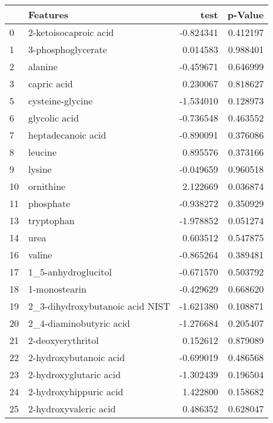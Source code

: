 \begin{tabular}{llrr}
\toprule
{} &                           Features &      test &   p-Value \\
\midrule
0   &              2-ketoisocaproic acid & -0.824341 &  0.412197 \\
1   &                 3-phosphoglycerate &  0.014583 &  0.988401 \\
2   &                            alanine & -0.459671 &  0.646999 \\
3   &                        capric acid &  0.230067 &  0.818627 \\
5   &                   cysteine-glycine & -1.534010 &  0.128973 \\
6   &                      glycolic acid & -0.736548 &  0.463552 \\
7   &                 heptadecanoic acid & -0.890091 &  0.376086 \\
8   &                            leucine &  0.895576 &  0.373166 \\
9   &                             lysine & -0.049659 &  0.960518 \\
10  &                          ornithine &  2.122669 &  0.036874 \\
11  &                          phosphate & -0.938272 &  0.350929 \\
13  &                         tryptophan & -1.978852 &  0.051274 \\
14  &                               urea &  0.603512 &  0.547875 \\
16  &                             valine & -0.865264 &  0.389481 \\
17  &                1\_5-anhydroglucitol & -0.671570 &  0.503792 \\
18  &                      1-monostearin & -0.429629 &  0.668620 \\
19  &    2\_3-dihydroxybutanoic acid NIST & -1.621380 &  0.108871 \\
20  &            2\_4-diaminobutyric acid & -1.276684 &  0.205407 \\
21  &                  2-deoxyerythritol &  0.152612 &  0.879089 \\
22  &             2-hydroxybutanoic acid & -0.699019 &  0.486568 \\
23  &             2-hydroxyglutaric acid & -1.302439 &  0.196504 \\
24  &             2-hydroxyhippuric acid &  1.422800 &  0.158682 \\
25  &              2-hydroxyvaleric acid &  0.486352 &  0.628047 \\

\end{tabular}
